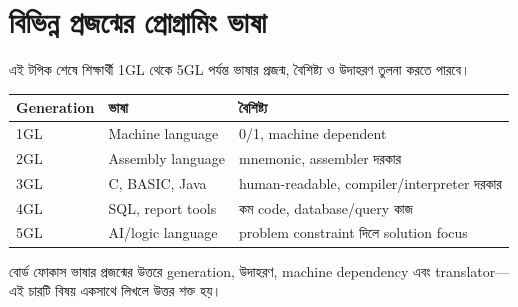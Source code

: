 \section{বিভিন্ন প্রজন্মের প্রোগ্রামিং ভাষা}

\begin{learningbox}
এই টপিক শেষে শিক্ষার্থী 1GL থেকে 5GL পর্যন্ত ভাষার প্রজন্ম, বৈশিষ্ট্য ও উদাহরণ তুলনা করতে পারবে।
\end{learningbox}

\begin{center}
\begin{tabular}{|p{}|p{}|p{}|}
\hline
\textbf{Generation} & \textbf{ভাষা} & \textbf{বৈশিষ্ট্য} \\
\hline
1GL & Machine language & 0/1, machine dependent \\
\hline
2GL & Assembly language & mnemonic, assembler দরকার \\
\hline
3GL & C, BASIC, Java & human-readable, compiler/interpreter দরকার \\
\hline
4GL & SQL, report tools & কম code, database/query কাজ \\
\hline
5GL & AI/logic language & problem constraint দিলে solution focus \\
\hline
\end{tabular}
\end{center}

\begin{center}
\end{center}

\begin{boardbox}{বোর্ড ফোকাস}
ভাষার প্রজন্মের উত্তরে generation, উদাহরণ, machine dependency এবং translator—এই চারটি বিষয় একসাথে লিখলে উত্তর শক্ত হয়।
\end{boardbox}
